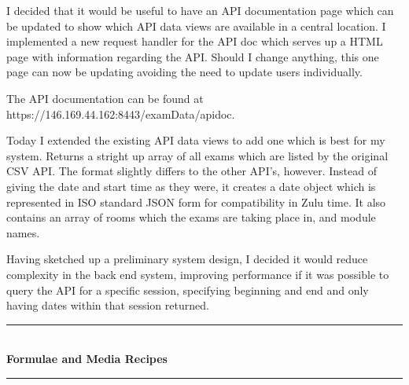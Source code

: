 \documentclass[idxtotoc,hyperref,openany]{labbook} %
\newcommand{\HRule}{\rule{\linewidth}{0.5mm}} %
\begin{document}

I decided that it would be useful to have an API documentation page which can be updated to show which API data views are available in a central location.  I implemented a new request handler for the API doc which serves up a HTML page with information regarding the API.  Should I change anything, this one page can now be updating avoiding the need to update users individually.

The API documentation can be found at https://146.169.44.162:8443/examData/apidoc.



Today I extended the existing API data views to add one which is best for my system.  Returns a stright up array of all exams which are listed by the original CSV API.  The format slightly differs to the other API's, however.  Instead of giving the date and start time as they were, it creates a date object which is represented in ISO standard JSON form for compatibility in Zulu time.  It also contains an array of rooms which the exams are taking place in, and module names.



Having sketched up a preliminary system design, I decided it would reduce complexity in the back end system, improving performance if it was possible to query the API for a specific session, specifying beginning and end and only having dates within that session returned.


\labday{} %

\begin{center}
\HRule \\[0.4cm]
{\huge \textbf{Formulae and Media Recipes}}\\[0.4cm] %
\HRule \\[1.5cm]
\end{center}

\end{document}

